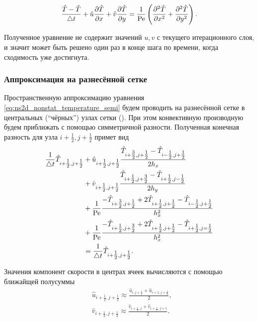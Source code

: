 \begin{equation}
\label{eq:ns2d_nonstat_temperature_semi}
\frac{\hat T - \check T}{\triangle t} + \hat u\frac{\partial \hat T}{\partial x} + \hat v\frac{\partial \hat T}{\partial y} = \frac{1}{\mathrm{Pe}}\left(\frac{\partial^2 \hat T}{\partial x^2} + \frac{\partial^2 \hat T}{\partial y^2}\right).
\end{equation}

Полученное уравнение не содержит значений $u, v$ с текущего итерационного слоя,
и значит может быть решено один раз в конце шага по времени, когда сходимость уже достигнута.

\subsubsection{Аппроксимация на разнесённой сетке}

Пространственную аппроксимацию уравнения \cref{eq:ns2d_nonstat_temperature_semi}
будем проводить на разнесённой сетке в центральных (``чёрных'') узлах сетки ().
При этом конвективную производную будем приближать с помощью симметричной разности.
Полученная конечная разность для узла $i+\tfrac12, j+\tfrac12$ примет вид
\begin{align}
\label{eq:ns2d_nonstat_temperature_scheme}
\frac{1}{\triangle t}\hat T_{i+\tfrac12,j+\tfrac12}
    & + \hat u_{i+\tfrac12, j+\tfrac12}\frac{\hat T_{i+\tfrac32, j+\tfrac12} - \hat T_{i-\tfrac12, j+\tfrac12}}{2h_x}\\
    \nonumber
    & + \hat v_{i+\tfrac12, j+\tfrac12}\frac{\hat T_{i+\tfrac12, j+\tfrac32} - \hat T_{i+\tfrac12, j-\tfrac12}}{2h_y}\\
    \nonumber
    & + \frac{1}{\mathrm{Pe}} \frac{-\hat T_{i+\tfrac32, j+\tfrac12} + 2\hat T_{i+\tfrac12,j+\tfrac12} - \hat T_{i-\tfrac12, j+\tfrac12}}{h_x^2} \\
    \nonumber
    & + \frac{1}{\mathrm{Pe}} \frac{-\hat T_{i+\tfrac12, j+\tfrac32} + 2\hat T_{i+\tfrac12,j+\tfrac12} - \hat T_{i+\tfrac12, j=\tfrac12}}{h_x^2} \\
    \nonumber
    & = \frac{1}{\triangle t}\check T_{i+\tfrac12,j+\tfrac12}.
\end{align}

Значения компонент скорости в центрах ячеек вычисляются с помощью ближайщей полусуммы
\begin{align*}
&\hat u_{i+\tfrac12, j+\tfrac12} \approx \frac{\hat u_{i, j+\tfrac12} + \hat u_{i+1, j+\tfrac12}}{2}, \\
&\hat v_{i+\tfrac12, j+\tfrac12} \approx \frac{\hat v_{i+\tfrac12, j} + \hat v_{i+\tfrac12, j+1}}{2}.
\end{align*}


